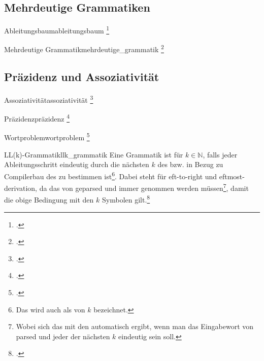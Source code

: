 \subsection{Mehrdeutige Grammatiken}
\begin{Definition}{Ableitungsbaum}{ableitungsbaum}
  \footcite{nebel_theoretische_2020}
\end{Definition}
\begin{Definition}{Mehrdeutige Grammatik}{mehrdeutige_grammatik}
  \footcite{nebel_theoretische_2020}
\end{Definition}
\subsection{Präzidenz und Assoziativität}
\begin{Definition}{Assoziativität}{assoziativität}
  \footcite{noauthor_parsing_nodate}
\end{Definition}
\begin{Definition}{Präzidenz}{präzidenz}
  \footcite{noauthor_parsing_nodate}
\end{Definition}
\begin{Definition}{Wortproblem}{wortproblem}
  \footcite{nebel_theoretische_2020}
\end{Definition}
\begin{Definition}{LL(k)-Grammatik}{llk_grammatik}
  Eine Grammatik ist  für $k\in\mathbb{N}$, falls jeder Ableitungsschritt eindeutig durch die nächsten $k$  des  bzw. in Bezug zu Compilerbau  des  zu bestimmen ist\footnote{Das wird auch als  von $k$ bezeichnet.}. Dabei steht  für eft-to-right und eftmost-derivation, da das  von  geparsed und immer  genommen werden müssen\footnote{Wobei sich das mit den  automatisch ergibt, wenn man das Eingabewort von   parsed und jeder der nächsten $k$  eindeutig sein soll.}, damit die obige Bedingung mit den  $k$ Symbolen gilt.\footcite{nebel_theoretische_2020}
\end{Definition}
